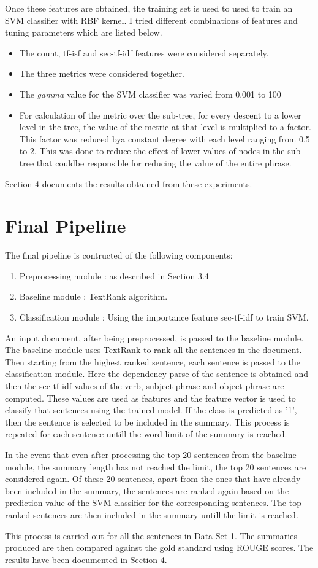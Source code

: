 Once these features are obtained, the training set is used to used to train an SVM classifier with RBF kernel.
I tried different combinations of features and tuning parameters which are listed below.
\begin{itemize}
\item The count, tf-isf and sec-tf-idf features were considered separately.
\item The three metrics were considered together.
\item The \textit{gamma} value for the SVM classifier was varied from 0.001 to 100
\item For calculation of the metric over the sub-tree, for every descent to a lower level in the tree, the value of the metric at that level is multiplied to a factor.
This factor was reduced bya constant degree with each level ranging from 0.5 to 2.
This was done to reduce the effect of lower values of nodes in the sub-tree that couldbe responsible for reducing the value of the entire phrase.
\end{itemize}

Section 4 documents the results obtained from these experiments.

\section{Final Pipeline}
The final pipeline is contructed of the following components:
\begin{enumerate}
\item Preprocessing module : as described in Section 3.4
\item Baseline module : TextRank algorithm.
\item Classification module : Using the importance feature sec-tf-idf to train SVM.
\end{enumerate}

An input document, after being preprocessed, is passed to the baseline module.
The baseline module uses TextRank to rank all the sentences in the document.
Then starting from the highest ranked sentence, each sentence is passed to the classification module. Here the dependency parse of the sentence is obtained and then the sec-tf-idf values of the verb, subject phrase and object phrase are computed.
These values are used as features and the feature vector is used to classify that sentences using the trained model.
If the class is predicted as '1', then the sentence is selected to be included in the summary.
This process is repeated for each sentence untill the word limit of the summary is reached.

In the event that even after processing the top 20 sentences from the baseline module, the summary length has not reached the limit, the top 20 sentences are considered again.
Of these 20 sentences, apart from the ones that have already been included in the summary, the sentences are ranked again based on the prediction value of the SVM classifier for the corresponding sentences.
The top ranked sentences are then included in the summary untill the limit is reached.

This process is carried out for all the sentences in Data Set 1.
The summaries produced are then compared against the gold standard using ROUGE scores.
The results have been documented in Section 4.